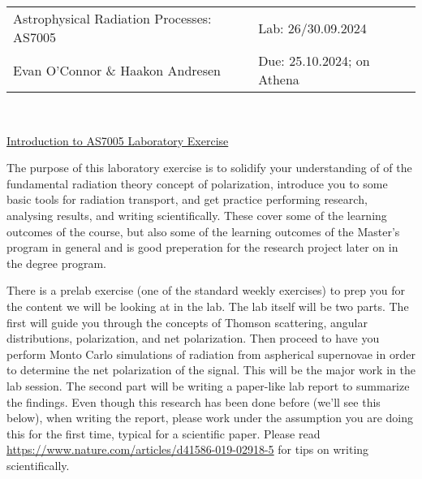 \documentclass[12pt]{amsart}
\begin{document}
\noindent
\begin{tabular}{L{9.7cm} R{6.7cm}}
Astrophysical Radiation Processes: AS7005& Lab: 26/30.09.2024 \\
Evan O'Connor \& Haakon Andresen & Due: 25.10.2024; on Athena\\
\end{tabular}\\

\vspace*{0.5cm}

\centerline{\Large \underline{Introduction to AS7005 Laboratory Exercise} }
\vspace*{0.5cm}

The purpose of this laboratory exercise is to solidify your
understanding of of the fundamental radiation theory concept of
polarization, introduce you to some basic tools for radiation
transport, and get practice performing research, analysing results,
and writing scientifically.  These cover some of the learning outcomes
of the course, but also some of the learning outcomes of the Master's
program in general and is good preperation for the research project
later on in the degree program.  \newline

There is a prelab exercise (one of the standard weekly exercises) to
prep you for the content we will be looking at in the lab.  The lab
itself will be two parts.  The first will guide you through the
concepts of Thomson scattering, angular distributions, polarization,
and net polarization. Then proceed to have you perform Monto Carlo
simulations of radiation from aspherical supernovae in order to
determine the net polarization of the signal.  This will be the major
work in the lab session. The second part will be writing a paper-like
lab report to summarize the findings. Even though this research has
been done before (we'll see this below), when writing the report,
please work under the assumption you are doing this for the first
time, typical for a scientific paper.  Please read
\mbox{\url{https://www.nature.com/articles/d41586-019-02918-5}} for
tips on writing scientifically.  \newline
\end{document}
